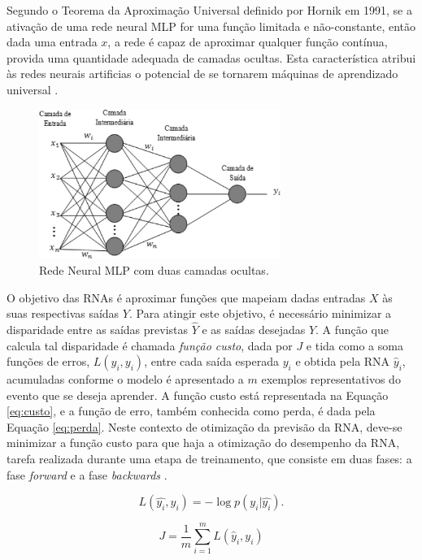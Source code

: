 Segundo o Teorema da Aproximação Universal definido por Hornik em 1991, se a ativação de uma rede neural MLP for uma função limitada e não-constante, então dada uma entrada $x$, a rede é capaz de aproximar qualquer função contínua, provida uma quantidade adequada de camadas ocultas. Esta característica atribui às redes neurais artificias o potencial de se tornarem máquinas de aprendizado universal \cite{hornik1991approximation}.

\begin{figure}[ht]
	\centering
	\caption{Rede Neural MLP com duas camadas ocultas.}
	\label{fig:mlp}
	\includegraphics[width=0.7\textwidth]{img/mlprna.jpg}
\end{figure}

O objetivo das RNAs é aproximar funções que mapeiam dadas entradas $X$ às suas respectivas saídas $Y$. Para atingir este objetivo, é necessário minimizar a disparidade entre as saídas previstas $\hat{Y}$ e as saídas desejadas $Y$. A função que calcula tal disparidade é chamada \emph{função custo}, dada por $J$ e tida como a soma funções de erros, $L(\hat{y}_i, y_i)$, entre cada saída esperada $y_i$ e obtida pela RNA $\hat{y}_i$, acumuladas conforme o modelo é apresentado a $m$ exemplos representativos do evento que se deseja aprender. A função custo está representada na Equação \ref{eq:custo}, e a função de erro, também conhecida como perda, é dada pela Equação \ref{eq:perda}. Neste contexto de otimização da previsão da RNA, deve-se minimizar a função custo para que haja a otimização do desempenho da RNA, tarefa realizada durante uma etapa de treinamento, que consiste em duas fases: a fase \emph{forward} e a fase \emph{backwards} \cite{haykin2009neural}.

\begin{equation}\label{eq:perda}
	L(\hat{y_i}, y_i) = - \log p (y_i|\hat{y_i}).
\end{equation}

\begin{equation}\label{eq:custo}
J = \frac{1}{m} \sum_{i=1}^{m} L(\hat{y}_{i}, y_{i})
\end{equation}

